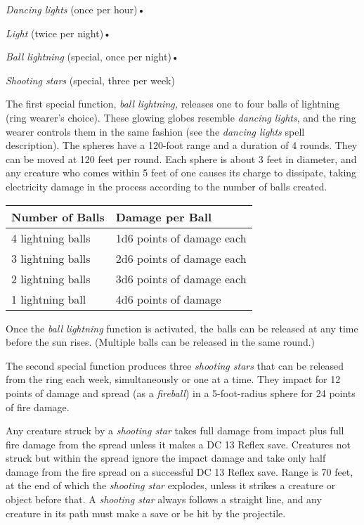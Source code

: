 \documentclass{article}
\begin{document}
\textit{Dancing lights }(once per hour)• 

\textit{Light }(twice per night)• 

\textit{Ball lightning }(special, once per night)• 

\textit{Shooting stars }(special, three per week)

The first special function, \textit{ball lightning, }releases one to four balls 
of lightning (ring wearer's choice). These glowing globes resemble \textit{dancing 
lights}, and the ring wearer controls them in the same fashion (see the \textit{dancing 
lights }spell description). The spheres have a 120-foot range and a duration of 
4 rounds. They can be moved at 120 feet per round. Each sphere is about 3 feet 
in diameter, and any creature who comes within 5 feet of one causes its charge 
to dissipate, taking electricity damage in the process according to the number 
of balls created.

\begin{tabular}{|>{\raggedright}p{68pt}|>{\raggedright}p{106pt}|}
\hline
N\textbf{umber of Balls} & D\textbf{amage per Ball}\tabularnewline
\hline
4 lightning balls & 1d6 points of damage each\tabularnewline
\hline
3 lightning balls & 2d6 points of damage each\tabularnewline
\hline
2 lightning balls & 3d6 points of damage each\tabularnewline
\hline
1 lightning ball & 4d6 points of damage\tabularnewline
\hline
\end{tabular}

Once the \textit{ball lightning }function is activated, the balls can be released 
at any time before the sun rises. (Multiple balls can be released in the same round.)

The second special function produces three \textit{shooting stars }that can be 
released from the ring each week, simultaneously or one at a time. They impact 
for 12 points of damage and spread (as a \textit{fireball}) in a 5-foot-radius 
sphere for 24 points of fire damage.

Any creature struck by a \textit{shooting star }takes full damage from impact plus 
full fire damage from the spread unless it makes a DC 13 Reflex save. Creatures 
not struck but within the spread ignore the impact damage and take only half damage 
from the fire spread on a successful DC 13 Reflex save. Range is 70 feet, at the 
end of which the \textit{shooting star }explodes, unless it strikes a creature 
or object before that. A \textit{shooting star }always follows a straight line, 
and any creature in its path must make a save or be hit by the projectile.
\end{document}
